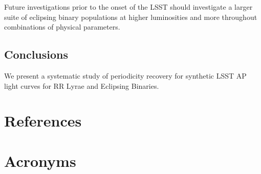 \documentclass[DM,authoryear,toc]{lsstdoc}
\begin{document}
Future investigations prior to the onset of the LSST should investigate a larger suite of eclipsing binary populations at higher luminosities and more throughout  combinations of physical parameters. 

\subsection{Conclusions}

We present a systematic study of periodicity recovery for synthetic LSST AP light curves for RR Lyrae and Eclipsing Binaries.


\appendix
\section{References} \label{sec:bib}


\section{Acronyms} \label{sec:acronyms}

\end{document}
